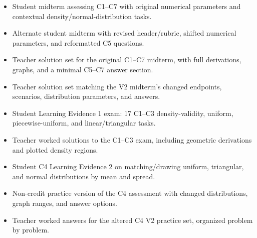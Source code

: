 \begin{itemize}
  \item {}

  Student midterm assessing C1–C7 with original numerical parameters and contextual density/normal-distribution tasks.

  \item {}

  Alternate student midterm with revised header/rubric, shifted numerical parameters, and reformatted C5 questions.

  \item {}

  Teacher solution set for the original C1–C7 midterm, with full derivations, graphs, and a minimal C5–C7 answer section.

  \item {}

  Teacher solution set matching the V2 midterm's changed endpoints, scenarios, distribution parameters, and answers.

  \item {}

  Student Learning Evidence 1 exam: 17 C1–C3 density-validity, uniform, piecewise-uniform, and linear/triangular tasks.

  \item {}

  Teacher worked solutions to the C1–C3 exam, including geometric derivations and plotted density regions.

  \item {}

  Student C4 Learning Evidence 2 on matching/drawing uniform, triangular, and normal distributions by mean and spread.

  \item {}

  Non-credit practice version of the C4 assessment with changed distributions, graph ranges, and answer options.

  \item {}

  Teacher worked answers for the altered C4 V2 practice set, organized problem by problem.


\end{itemize}
